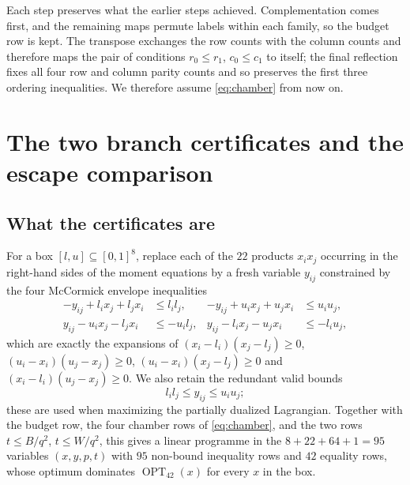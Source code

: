\documentclass[11pt]{amsart}
\theoremstyle{definition}
\theoremstyle{remark}
\newcommand{\OPT}{\operatorname{OPT}_{42}}
\begin{document}
Each step preserves what the earlier steps achieved.  Complementation comes
first, and the remaining maps permute labels within each family, so the
budget row is kept.  The transpose exchanges the row counts with the column
counts and therefore maps the pair of conditions $r_0\le r_1$, $c_0\le c_1$
to itself; the final reflection fixes all four row and column parity counts
and so preserves the first three ordering inequalities.  We therefore assume
\eqref{eq:chamber} from now on.

\section{The two branch certificates and the escape comparison}\label{sec:cert}

\subsection{What the certificates are}

For a box $[l,u]\subseteq[0,1]^8$, replace each of the $22$ products $x_ix_j$ occurring in the right-hand sides of the moment equations by a fresh variable $y_{ij}$ constrained by the four McCormick envelope inequalities
\begin{equation}\label{eq:mccormick}
\begin{aligned}
-y_{ij}+l_ix_j+l_jx_i&\le l_il_j, & -y_{ij}+u_ix_j+u_jx_i&\le u_iu_j,\\
y_{ij}-u_ix_j-l_jx_i&\le-u_il_j, & y_{ij}-l_ix_j-u_jx_i&\le-l_iu_j,
\end{aligned}
\end{equation}
which are exactly the expansions of $(x_i-l_i)(x_j-l_j)\ge0$, $(u_i-x_i)(u_j-x_j)\ge0$, $(u_i-x_i)(x_j-l_j)\ge0$ and $(x_i-l_i)(u_j-x_j)\ge0$.  We also retain the redundant valid bounds
\[
l_il_j\le y_{ij}\le u_iu_j;
\]
these are used when maximizing the partially dualized Lagrangian.  Together
with the budget row, the four chamber rows of \eqref{eq:chamber}, and the two
rows $t\le B/q^2$, $t\le W/q^2$, this gives a linear programme in the
$8+22+64+1=95$ variables $(x,y,p,t)$ with $95$ non-bound inequality rows
and $42$ equality rows, whose optimum dominates $\OPT(x)$ for every $x$ in
the box.
\end{document}
